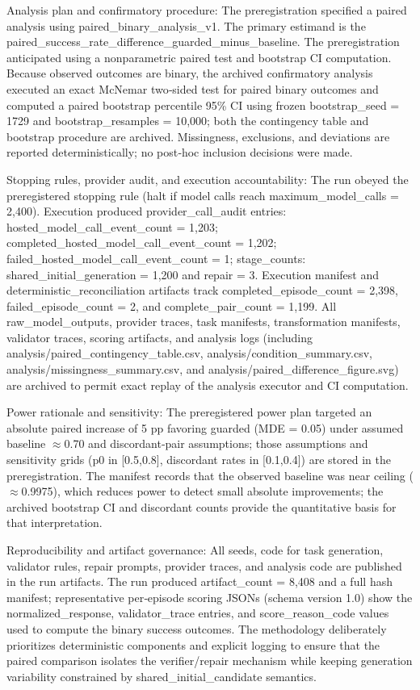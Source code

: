 \documentclass[conference]{IEEEtran}
\begin{document}
Analysis plan and confirmatory procedure: The preregistration specified a paired analysis using paired\_binary\_analysis\_v1. The primary estimand is the paired\_success\_rate\_difference\_guarded\_minus\_baseline. The preregistration anticipated using a nonparametric paired test and bootstrap CI computation. Because observed outcomes are binary, the archived confirmatory analysis executed an exact McNemar two‑sided test for paired binary outcomes and computed a paired bootstrap percentile 95\% CI using frozen bootstrap\_seed = 1729 and bootstrap\_resamples = 10,000; both the contingency table and bootstrap procedure are archived. Missingness, exclusions, and deviations are reported deterministically; no post‑hoc inclusion decisions were made.

Stopping rules, provider audit, and execution accountability: The run obeyed the preregistered stopping rule (halt if model calls reach maximum\_model\_calls = 2,400). Execution produced provider\_call\_audit entries: hosted\_model\_call\_event\_count = 1,203; completed\_hosted\_model\_call\_event\_count = 1,202; failed\_hosted\_model\_call\_event\_count = 1; stage\_counts: shared\_initial\_generation = 1,200 and repair = 3. Execution manifest and deterministic\_reconciliation artifacts track completed\_episode\_count = 2,398, failed\_episode\_count = 2, and complete\_pair\_count = 1,199. All raw\_model\_outputs, provider traces, task manifests, transformation manifests, validator traces, scoring artifacts, and analysis logs (including analysis/paired\_contingency\_table.csv, analysis/condition\_summary.csv, analysis/missingness\_summary.csv, and analysis/paired\_difference\_figure.svg) are archived to permit exact replay of the analysis executor and CI computation.

Power rationale and sensitivity: The preregistered power plan targeted an absolute paired increase of 5 pp favoring guarded (MDE = 0.05) under assumed baseline \ensuremath{\approx}0.70 and discordant‑pair assumptions; those assumptions and sensitivity grids (p0 in [0.5,0.8], discordant rates in [0.1,0.4]) are stored in the preregistration. The manifest records that the observed baseline was near ceiling (\ensuremath{\approx}0.9975), which reduces power to detect small absolute improvements; the archived bootstrap CI and discordant counts provide the quantitative basis for that interpretation.

Reproducibility and artifact governance: All seeds, code for task generation, validator rules, repair prompts, provider traces, and analysis code are published in the run artifacts. The run produced artifact\_count = 8,408 and a full hash manifest; representative per‑episode scoring JSONs (schema version 1.0) show the normalized\_response, validator\_trace entries, and score\_reason\_code values used to compute the binary success outcomes. The methodology deliberately prioritizes deterministic components and explicit logging to ensure that the paired comparison isolates the verifier/repair mechanism while keeping generation variability constrained by shared\_initial\_candidate semantics.
\end{document}
